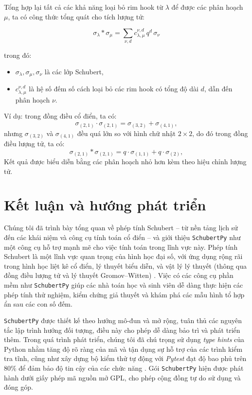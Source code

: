 Tổng hợp lại tất cả các khả năng loại bỏ rim hook từ $\lambda$ để được các phân hoạch $\mu$, ta có công thức tổng quát cho tích lượng tử:

$$
\sigma_{\lambda} * \sigma_{\mu} = \sum_{\nu, d} c_{\lambda,\mu}^{\nu,d} \, q^d \, \sigma_{\nu}
$$

trong đó:
\begin{itemize}
    \item $\sigma_{\lambda}, \sigma_{\mu}, \sigma_{\nu}$ là các lớp Schubert,
    \item $c_{\lambda,\mu}^{\nu,d}$ là hệ số đếm số cách loại bỏ các rim hook có tổng độ dài $d$, dẫn đến phân hoạch $\nu$.
\end{itemize}

Ví dụ: trong đồng điều cổ điển, ta có:
\[
\sigma_{(2,1)} \cdot \sigma_{(2,1)} = \sigma_{(3,2)} + \sigma_{(4,1)},
\]
nhưng \(\sigma_{(3,2)}\) và \(\sigma_{(4,1)}\) đều quá lớn so với hình chữ nhật \(2 \times 2\), do đó trong đồng điều lượng tử, ta có:
\[
\sigma_{(2,1)} * \sigma_{(2,1)} = q \cdot \sigma_{(1,1)} + q \cdot \sigma_{(2)},
\]
Kết quả được biểu diễn bằng các phân hoạch nhỏ hơn kèm theo hiệu chỉnh lượng tử.

\section{Kết luận và hướng phát triển}
Chúng tôi đã trình bày tổng quan về phép tính Schubert – từ nền tảng lịch sử đến các khái niệm và công cụ tính toán cổ điển – và giới thiệu \texttt{SchubertPy} như một công cụ hỗ trợ mạnh mẽ cho việc tính toán trong lĩnh vực này. Phép tính Schubert là một lĩnh vực quan trọng của hình học đại số, với ứng dụng rộng rãi trong hình học liệt kê cổ điển, lý thuyết biểu diễn, và vật lý lý thuyết (thông qua đồng điều lượng tử và lý thuyết Gromov–Witten) \cite{Kontsevich_1994}. Việc có các công cụ phần mềm như \texttt{SchubertPy} giúp các nhà toán học và sinh viên dễ dàng thực hiện các phép tính thử nghiệm, kiểm chứng giả thuyết và khám phá các mẫu hình tổ hợp ẩn sau các con số đếm.

\texttt{SchubertPy} được thiết kế theo hướng mô-đun và mở rộng, tuân thủ các nguyên tắc lập trình hướng đối tượng, điều này cho phép dễ dàng bảo trì và phát triển thêm. Trong quá trình phát triển, chúng tôi đã chú trọng sử dụng \textit{type hints} của Python nhằm tăng độ rõ ràng của mã và tận dụng sự hỗ trợ của các trình kiểm tra tĩnh, cũng như xây dựng bộ kiểm thử tự động với \textit{Pytest} đạt độ bao phủ trên 80\% để đảm bảo độ tin cậy của các chức năng \cite{PythonTyping2023,PythonUnittestLib}. Gói \texttt{SchubertPy} hiện được phát hành dưới giấy phép mã nguồn mở GPL, cho phép cộng đồng tự do sử dụng và đóng góp.

